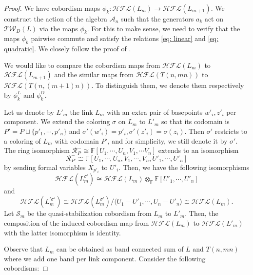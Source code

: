 \documentclass{amsart}
\newcommand{\CA}{\mathcal{A}}
\newcommand{\Tw}{\mathcal{TW}}
\newcommand{\F}{\mathbb{F}}
\newcommand{\cHFL}{\mathcal{H\!F\! L}}
\renewcommand{\AA}[1]{{\color{blue}#1}}
\begin{document}
\begin{proof}
We have cobordism maps $\phi_k:\cHFL(L_m)\to \cHFL(L_{m+1})$. We construct the action of the algebra $\CA_n$ such that the generators $a_k$ act on $\Tw_D(L)$ via the maps $\phi_k$. For this to make sense, we need to verify that the maps $\phi_k$ pairwise commute and satisfy the relations \eqref{eq: linear} and \eqref{eq: quadratic}. 
We closely follow the proof of \cite[Proposition 3.13]{AGL}. 

We would like to compare the cobordism maps from $\cHFL(L_m)$ to $\cHFL(L_{m+1})$ and the similar maps from $\cHFL(T(n,mn))$ to $\cHFL(T(n,(m+1)n))$. To distinguish them, we denote them respectively by $\phi_k^{L}$ and $\phi_k^{O}$. %

Let us denote by $L'_{m}$ the link $L_{m}$ with an extra pair of basepoints $w'_i,z'_i$ per component. We extend the coloring $\sigma$ on $L_{m}$ to $L'_{m}$ so that its codomain is $P'=P\sqcup \{p'_1, \cdots, p'_n\}$
and $\sigma'(w'_i)=p'_i, \sigma'(z'_i)=\sigma(z_i)$.
Then $\sigma'$ restricts to a coloring of $L_{m}$ with codomain $P'$, and for simplicity, we still denote it by $\sigma'$. The ring isomorphism $\mathcal{R}_P^-\cong \F[U_1, \cdots, U_n, V_1, \cdots V_n]$ extends to an isomorphism 
$$\mathcal{R}_{P'}^-\cong \F[U_1, \cdots, U_n, V_1, \cdots, V_n, U'_1, \cdots , U'_n]$$
by sending formal variables $X_{p'_i}$ to $U'_i$. Then, we have the following isomorphisms
$$\cHFL(L_m^{\sigma'})\cong \cHFL(L_m)\otimes_{\F} \F[U'_1, \cdots, U'_n] $$
and 
$$\cHFL(L_m^{'\sigma'})\cong \cHFL(L_m^{\sigma'})/ \langle U_1-U'_1, \cdots, U_n-U'_n\rangle \cong \cHFL(L_m).$$
Let $\mathcal{S}_m$ be the quasi-stabilization cobordism from $L_m$ to $L'_{m}$. Then, the composition of the induced cobordism map from $\cHFL(L_m)$ to $\cHFL(L'_m)$ with the latter isomorphism is identity.






Observe that $L_m$ can be obtained as band connected sum of $L$ and $T(n,mn)$ where we add one band per link component. Consider the following cobordisms: 


\end{proof}
\end{document}

